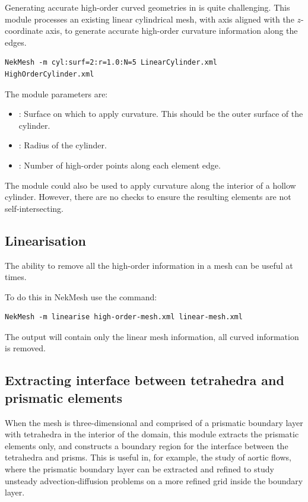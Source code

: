 Generating accurate high-order curved geometries in \gmsh is quite challenging.
This module processes an existing linear cylindrical mesh, with axis aligned
with the $z$-coordinate axis, to generate accurate high-order curvature
information along the edges.

\begin{lstlisting}[style=BashInputStyle]
NekMesh -m cyl:surf=2:r=1.0:N=5 LinearCylinder.xml HighOrderCylinder.xml
\end{lstlisting}

The module parameters are:

\begin{itemize}
  \item {}: Surface on which to apply curvature. This should be the
  outer surface of the cylinder.
  \item {}: Radius of the cylinder.
  \item {}: Number of high-order points along each element edge.
\end{itemize}

\begin{notebox}
  The module could also be used to apply curvature along the interior of a
  hollow cylinder. However, there are no checks to ensure the resulting elements
  are not self-intersecting.
\end{notebox}

\subsection{Linearisation}

The ability to remove all the high-order information in a mesh can be useful
at times.

To do this in NekMesh use the command:

\begin{lstlisting}[style=BashInputStyle]
  NekMesh -m linearise high-order-mesh.xml linear-mesh.xml
\end{lstlisting}

The output will contain only the linear mesh information, all curved information
is removed.

\subsection{Extracting interface between tetrahedra and prismatic elements}

When the mesh is three-dimensional and comprised of a prismatic boundary layer
with tetrahedra in the interior of the domain, this module extracts the
prismatic elements only, and constructs a boundary region for the interface
between the tetrahedra and prisms. This is useful in, for example, the study of
aortic flows, where the prismatic boundary layer can be extracted and refined to
study unsteady advection-diffusion problems on a more refined grid inside the
boundary layer.

